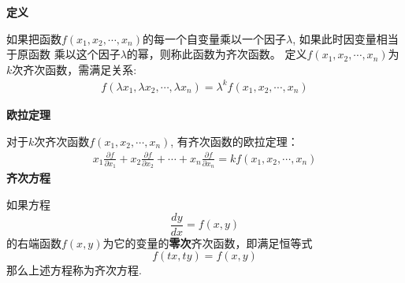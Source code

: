\documentclass[fontset=windows]{article}
\begin{document}
    \begin{tcolorbox}[colback=blue!5!white,colframe=blue!75!black,title=齐次函数]
     \noindent \textbf{定义}

     如果把函数$f(x_1, x_2, \cdots , x_n)$的每一个自变量乘以一个因子$\lambda$, 如果此时因变量相当于原函数
     乘以这个因子$\lambda$的幂，则称此函数为齐次函数。
     定义$f(x_1, x_2, \cdots , x_n)$为$k$次齐次函数，需满足关系:
     \begin{align*}
      f(\lambda x_1, \lambda x_2, \cdots , \lambda x_n) = \lambda^{k} f(x_1, x_2, \cdots , x_n)
     \end{align*} 

     \noindent \textbf{欧拉定理}

     对于$k$次齐次函数$f(x_1, x_2, \cdots , x_n)$, 有齐次函数的欧拉定理：
     \begin{align}
      x_1 \frac{\partial f}{\partial x_1} + x_2 \frac{\partial f}{\partial x_2} + \cdots + x_n \frac{\partial f}{\partial x_n} = kf(x_1, x_2, \cdots , x_n)
    \end{align}
    \noindent\textbf{齐次方程}

    如果方程
    \[\frac{dy}{dx}= f(x, y)\]
    的右端函数$f(x, y)$为它的变量的\textbf{零次}齐次函数，即满足恒等式
    \[f(tx, ty) = f(x, y)\]
    那么上述方程称为齐次方程.
    \end{tcolorbox}
    \newpage
\end{document}
